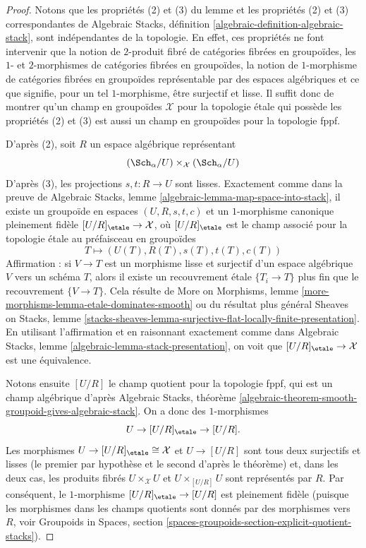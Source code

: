 \begin{proof}
Notons que les propriétés (2) et (3) du lemme et les propriétés
(2) et (3) correspondantes de
Algebraic Stacks, définition \ref{algebraic-definition-algebraic-stack},
sont indépendantes de la topologie. En effet, ces propriétés
ne font intervenir que la notion de $2$-produit fibré de catégories fibrées en
groupoïdes, les $1$- et $2$-morphismes de catégories fibrées en groupoïdes, la
notion de $1$-morphisme de catégories fibrées en groupoïdes représentable
par des espaces algébriques et ce que signifie, pour un tel $1$-morphisme, être
surjectif et lisse.
Il suffit donc de montrer qu'un champ en groupoïdes $\mathcal{X}$ pour la topologie
étale qui possède les propriétés (2) et (3) est aussi un champ en groupoïdes pour la topologie fppf.

\medskip\noindent
D'après (2), soit $R$ un espace algébrique représentant
$$
(\Sch_\alpha/U) \times_\mathcal{X} (\Sch_\alpha/U)
$$
D'après (3), les projections $s, t : R \to U$ sont lisses. Exactement comme dans la preuve de
Algebraic Stacks, lemme \ref{algebraic-lemma-map-space-into-stack},
il existe un groupoïde en espaces $(U, R, s, t, c)$ et un $1$-morphisme
canonique pleinement fidèle $[U/R]_\etale \to \mathcal{X}$,
où $[U/R]_\etale$ est le champ associé pour la topologie étale au préfaisceau
en groupoïdes
$$
T \longmapsto (U(T), R(T), s(T), t(T), c(T))
$$
Affirmation : si $V \to T$ est un morphisme lisse et surjectif d'un espace algébrique
$V$ vers un schéma $T$, alors il existe un recouvrement étale $\{T_i \to T\}$
plus fin que le recouvrement $\{V \to T\}$. Cela résulte de
More on Morphisms, lemme \ref{more-morphisms-lemma-etale-dominates-smooth}
ou du résultat plus général
Sheaves on Stacks, lemme
\ref{stacks-sheaves-lemma-surjective-flat-locally-finite-presentation}.
En utilisant l'affirmation et en raisonnant exactement comme dans
Algebraic Stacks, lemme \ref{algebraic-lemma-stack-presentation},
on voit que $[U/R]_\etale \to \mathcal{X}$ est une
équivalence.

\medskip\noindent
Notons ensuite $[U/R]$ le champ quotient pour la topologie fppf,
qui est un champ algébrique d'après
Algebraic Stacks, théorème
\ref{algebraic-theorem-smooth-groupoid-gives-algebraic-stack}.
On a donc des $1$-morphismes
$$
U \to [U/R]_\etale \to [U/R].
$$
Les morphismes $U \to [U/R]_\etale \cong \mathcal{X}$ et
$U \to [U/R]$ sont tous deux surjectifs et lisses (le premier par hypothèse
et le second d'après le théorème) et, dans les deux cas, les
produits fibrés $U \times_\mathcal{X} U$ et $U \times_{[U/R]} U$
sont représentés par $R$. Par conséquent, le $1$-morphisme
$[U/R]_\etale \to [U/R]$ est pleinement fidèle (puisque les morphismes
dans les champs quotients sont donnés par des morphismes vers $R$, voir
Groupoids in Spaces, section
\ref{spaces-groupoids-section-explicit-quotient-stacks}).


\end{proof}
